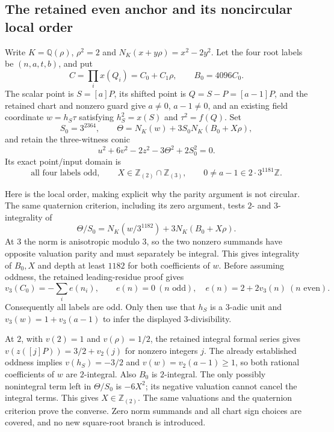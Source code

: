 \subsection{The retained even anchor and its noncircular local order}

Write $K=\mathbb Q(\rho)$, $\rho^2=2$ and
$N_K(x+y\rho)=x^2-2y^2$. Let the four root labels be $(n,a,t,b)$,
and put
\[
 C=\prod_i x(Q_i)=C_0+C_1\rho,\qquad B_0=4096C_0.
\]
The scalar point is $S=[a]P$, its shifted point is
$Q=S-P=[a-1]P$, and the retained chart and nonzero guard give
$a\ne0$, $a-1\ne0$, and an existing field coordinate
$w=h_S\tau$ satisfying $h_S^2=x(S)$ and $\tau^2=f(Q)$.
Set
\[
 S_0=3^{2364},\qquad
 \Theta=N_K(w)+3S_0N_K(B_0+X\rho),
\]
and retain the three-witness conic
\[
 u^2+6v^2-2z^2-3\Theta^2+2S_0^2=0.
\]
Its exact point/input domain is
\begin{equation}\label{r8:anchor-domain}
 \text{all four labels odd},\qquad
 X\in\mathbb Z_{(2)}\cap\mathbb Z_{(3)},\qquad
 0\ne a-1\in2\cdot3^{1181}\mathbb Z.
\end{equation}

Here is the local order, making explicit why the parity argument is
not circular. The same quaternion criterion, including its zero
argument, tests $2$- and $3$-integrality of
\[
 \Theta/S_0=N_K(w/3^{1182})+3N_K(B_0+X\rho).
\]
At $3$ the norm is anisotropic modulo $3$, so the two nonzero summands
have opposite valuation parity and must separately be integral.
This gives integrality of $B_0,X$ and depth at least $1182$ for both
coefficients of $w$. Before assuming oddness, the retained leading-residue
proof gives
\[
 v_3(C_0)=-\sum_i e(n_i),\qquad
 e(n)=0\ (n\text{ odd}),\quad e(n)=2+2v_3(n)\ (n\text{ even}).
\]
Consequently all labels are odd. Only then use that $h_S$ is a
$3$-adic unit and $v_3(w)=1+v_3(a-1)$ to infer the displayed
$3$-divisibility.

At $2$, with $v(2)=1$ and $v(\rho)=1/2$, the retained integral formal
series gives $v(z([j]P))=3/2+v_2(j)$ for nonzero integers $j$.
The already established oddness implies
$v(h_S)=-3/2$ and $v(w)=v_2(a-1)\ge1$, so both rational
coefficients of $w$ are $2$-integral. Also $B_0$ is $2$-integral.
The only possibly nonintegral term left in $\Theta/S_0$ is $-6X^2$;
its negative valuation cannot cancel the integral terms. This gives
$X\in\mathbb Z_{(2)}$. The same valuations and the quaternion
criterion prove the converse. Zero norm summands and all chart sign
choices are covered, and no new square-root branch is introduced.

